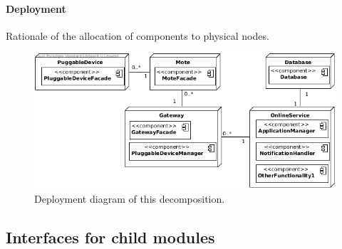 
    \paragraph{Deployment}
        Rationale of the allocation of components to physical nodes.

        \begin{figure}[!htp]
        	\centering
        	\includegraphics[width=1.00\textwidth]{deployment-diagram-1}
        	\caption{Deployment diagram of this decomposition.
        	}\label{fig:it1-depl_main}
        \end{figure}


\subsection{Interfaces for child modules}

